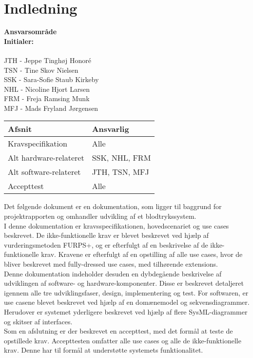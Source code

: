 \chapter{Indledning}


\textbf{Ansvarsområde} \\
\textbf{Initialer: } \\
\\
JTH - Jeppe Tinghøj Honoré\\
TSN - Tine Skov Nielsen\\
SSK - Sara-Sofie Staub Kirkeby\\
NHL - Nicoline Hjort Larsen\\
FRM - Freja Ramsing Munk\\
MFJ - Mads Fryland Jørgensen\\

\begin{longtabu} to 
    Afsnit &    Ansvarlig\\[-1ex]
    \midrule
    Kravspecifikation & Alle\\
   Alt hardware-relateret & SSK, NHL, FRM\\
   Alt software-relateret & JTH, TSN, MFJ\\ 
   Accepttest & Alle\\  
\end{longtabu}

Det følgende dokument er en dokumentation, som ligger til baggrund for projektrapporten og omhandler udvikling af et blodtrykssystem.\\
I denne dokumentation er kravsspecifikationen, hovedscenariet og use cases beskrevet. De ikke-funktionelle krav er blevet beskrevet ved hjælp af vurderingsmetoden FURPS+, og er efterfulgt af en beskrivelse af de ikke-funktionelle krav. Kravene er efterfulgt af en opstilling af alle use cases, hvor de bliver beskrevet med fully-dressed use cases, med tilhørende extensions.\\[1ex]
Denne dokumentation indeholder desuden en dybdegående beskrivelse af udviklingen af software- og hardware-komponenter. Disse er beskrevet detaljeret igennem alle tre udviklingsfaser, design, implementering og test. For softwaren, er use casene blevet beskrevet ved hjælp af en domænemodel og sekvensdiagrammer. Herudover er systemet yderligere beskrevet ved hjælp af flere SysML-diagrammer og skitser af interfaces.\\[1ex]
Som en afslutning er der beskrevet en accepttest, med det formål at teste de opstillede krav. Accepttesten omfatter alle use cases og alle de ikke-funktionelle krav. Denne har til formål at understøtte systemets funktionalitet. \\
